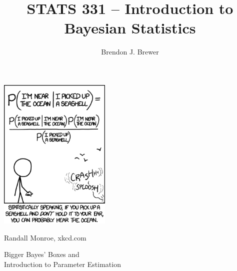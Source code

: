 \documentclass{beamer}
\author{Brendon J. Brewer}
\title{STATS 331 -- Introduction to Bayesian Statistics}
\institute{The University of Auckland}
\date{}
\begin{document}
\frame{\titlepage}

\begin{frame}
\begin{center}
\includegraphics[width=0.4\textwidth]{images/seashell.png}
\end{center}

Randall Monroe, xkcd.com

\end{frame}


\begin{frame}

\begin{center}
\large
Bigger Bayes' Boxes and \\
Introduction to Parameter Estimation
\end{center}

\end{frame}
\end{document}
